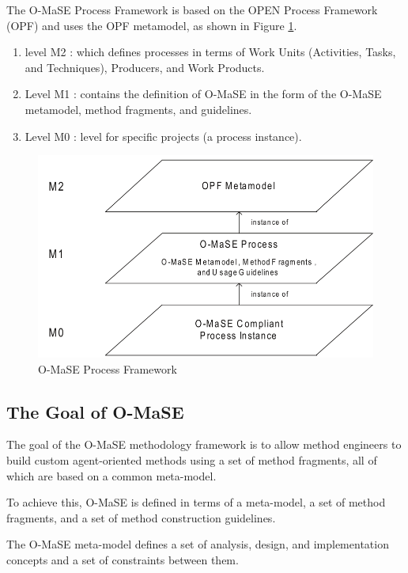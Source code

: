 The O-MaSE Process Framework is based on the OPEN Process Framework (OPF)
and uses the OPF metamodel, as shown in Figure \ref{fig:O-MaSE Process Framework}\cite{omacs4}.

\begin{enumerate}
\item 
	level M2 : which defines processes in terms of Work Units (Activities, Tasks, and Techniques),
	 Producers, and Work Products.
\item
	Level M1 : contains the definition of O-MaSE in the form of the O-MaSE metamodel, method fragments, and guidelines. 
\item
	Level M0 : level for specific projects (a process instance).
\end{enumerate} 

\begin{figure}[th]
	\centering %
		\includegraphics[scale=0.4]{ch1/img/omase}
	\caption{\label{fig:O-MaSE Process Framework}O-MaSE Process Framework \cite{omacs4}}
\end{figure}
\subsection{The Goal of O-MaSE}

The goal of the O-MaSE methodology framework is to allow method engineers to
build custom agent-oriented methods using a set of method fragments, all of which are
based on a common meta-model\cite{omacs7}.

To achieve this, O-MaSE is defined in terms of a meta-model, a set of method fragments, 
and a set of method construction guidelines. 

The O-MaSE meta-model defines a set of analysis, design, and implementation concepts and a
set of constraints between them. 

